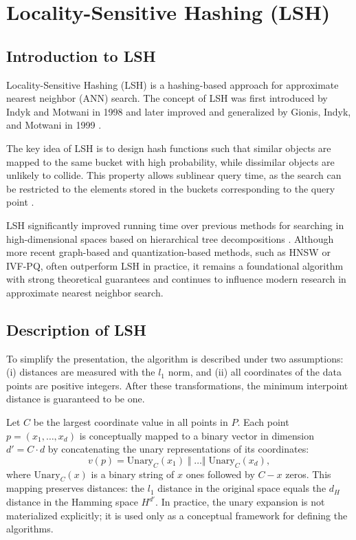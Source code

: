 \section{Locality-Sensitive Hashing (LSH)}

\subsection{Introduction to LSH}

Locality-Sensitive Hashing (LSH) is a hashing-based approach for approximate nearest neighbor (ANN) search. The concept of LSH was first introduced by Indyk and Motwani in 1998 \cite{Indyk-Motwani-1998} and later improved and generalized by Gionis, Indyk, and Motwani in 1999 \cite{Gionis-Indyk-Motwani-1999}.

The key idea of LSH is to design hash functions such that similar objects are mapped to the same bucket with high probability, while dissimilar objects are unlikely to collide. This property allows sublinear query time, as the search can be restricted to the elements stored in the buckets corresponding to the query point \cite{Gionis-Indyk-Motwani-1999}.

LSH significantly improved running time over previous methods for searching in high-dimensional spaces based on hierarchical tree decompositions \cite{Gionis-Indyk-Motwani-1999}. Although more recent graph-based and quantization-based methods, such as HNSW or IVF-PQ, often outperform LSH in practice, it remains a foundational algorithm with strong theoretical guarantees and continues to influence modern research in approximate nearest neighbor search.

\subsection{Description of LSH}

To simplify the presentation, the algorithm is described \cite{Gionis-Indyk-Motwani-1999} under two assumptions: (i) distances are measured with the $l_1$ norm, and (ii) all coordinates of the data points are positive integers. After these transformations, the minimum interpoint distance is guaranteed to be one.

Let $C$ be the largest coordinate value in all points in $P$. Each point 
$p = (x_{1}, \ldots, x_{d})$ is conceptually mapped to a binary vector in dimension $d' = C \cdot d$ by concatenating the unary representations of its coordinates:
\[
v(p) = \text{Unary}_{C}(x_{1}) \;\Vert\; \dots \Vert\; \text{Unary}_{C}(x_{d}),
\]
where $\text{Unary}_{C}(x)$ is a binary string of $x$ ones followed by $C - x$ zeros. This mapping preserves distances: the $l_1$ distance in the original space equals the $d_H$ distance in the Hamming space $H^{d'}$. In practice, the unary expansion is not materialized explicitly; it is used only as a conceptual framework for defining the algorithms.

